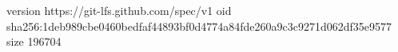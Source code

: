 version https://git-lfs.github.com/spec/v1
oid sha256:1deb989cbe0460bedfaf44893bf0d4774a84fde260a9c3c9271d062df35e9577
size 196704
